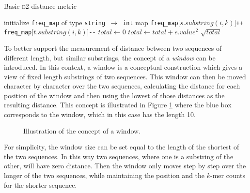 \begin{algorithm}[H]
  \caption{Basic \textsc{d2} distance metric}
  \label{alg:d2_basic}
  \begin{algorithmic}[1]
    \Statex
      \State initialize \texttt{freq\_map} of type \texttt{string $\to$ int} map
        \State \texttt{freq\_map}[$s.substring(i, k)$]\texttt{++}
      \EndFor
        \State \texttt{freq\_map}[$t.substring(i, k)$]\texttt{-{}-}
      \EndFor
      \State $total \gets 0$
        \State $total \gets total + e.value^2$
      \EndFor
      \State \Return $\sqrt{total}$
    \EndFunction
  \end{algorithmic}
\end{algorithm}

To better support the measurement of distance between two sequences of
different length, but similar substrings, the concept of a \emph{window} can
be introduced. In this context, a window is a conceptual construction which
gives a view of fixed length substrings of two sequences. This window can then
be moved character by character over the two sequences, calculating the
distance for each position of the window and then using the lowest of those
distances as the resulting distance. This concept is illustrated in Figure
\ref{fig:d2_window_concept} where the blue box corresponds to the window,
which in this case has the length 10.

\begin{figure}[H]
\centering
{}
\caption{Illustration of the concept of a window.}
\label{fig:d2_window_concept}
\end{figure}

For simplicity, the window size can be set equal to the length of the shortest
of the two sequences. In this way two sequences, where one is a substring of
the other, will have zero distance. Then the window only moves step by step
over the longer of the two sequences, while maintaining the position and the
$k$-mer counts for the shorter sequence.


